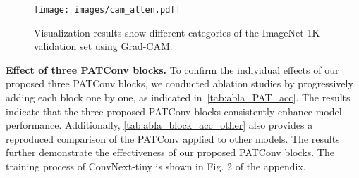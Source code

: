 \begin{figure}[ht]
  \centering
  \texttt{[image: images/cam\_atten.pdf]}
  \caption{Visualization results show different categories of the ImageNet-1K validation set using Grad-CAM.}
  \label{fig:cam_atten}
\end{figure}

\textbf{Effect of three PATConv blocks.}
To confirm the individual effects of our proposed three PATConv blocks, we conducted ablation studies by progressively adding each block one by one, as indicated in~\cref{tab:abla_PAT_acc}. The results indicate that the three proposed PATConv blocks consistently enhance model performance. Additionally, \cref{tab:abla_block_acc_other} also provides a reproduced comparison of the PATConv applied to other models. The results further demonstrate the effectiveness of our proposed PATConv blocks. The training process of ConvNext-tiny is shown in Fig. 2 of the appendix.

\begin{table}[ht] \small
  \centering
  \caption{Ablation experiments of PartialNet-T2 with different configurations of PAT blocks on the ImageNet-1K.}
  \label{tab:abla_PAT_acc}
\end{table}

